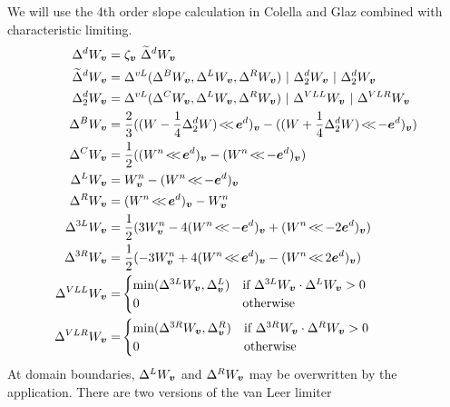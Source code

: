 We will use the 4th order slope calculation in Colella and Glaz
\cite{ColellaGlaz} combined with characteristic limiting.  
\begin{align*}
\Delta^d W_\vbold = & \; \zeta_\vbold ~ \widetilde{\Delta}^d W_\vbold \\
\widetilde{\Delta}^d W_\vbold = & \; 
\Delta^{vL}( \Delta^B W_\vbold,\Delta^L W_\vbold,\Delta^R W_\vbold ) ~
| ~ \Delta^d_2 W_\vbold ~ | ~ \Delta^d_2 W_\vbold \\ 
\Delta^d_2 W_\vbold = & \;
\Delta^{vL}(\Delta^C W_\vbold, \Delta^L W_\vbold, \Delta^R
W_\vbold)~|~\Delta^{VLL} W_\vbold~|~\Delta^{VLR} W_\vbold \\ 
\Delta^B W_\vbold = & \; \frac{2}{3}(\ebshift{(W -
\frac{1}{4}\Delta^d_2 W)}{\ebold^d})_\vbold - 
(\ebshift{(W + \frac{1}{4}\Delta^d_2 W)}{-\ebold^d})_\vbold) \\
\Delta^C {W}_\vbold = & \; \half((\ebshift{W^n}{ \ebold^d})_\vbold -
                                 (\ebshift{W^n}{-\ebold^d})_\vbold) \\
\Delta^L {W}_\vbold = & \; W^n_\vbold -
(\ebshift{W^n}{-\ebold^d})_\vbold \\ 
\Delta^R {W}_\vbold = & \; (\ebshift{W^n}{\ebold^d})_\vbold - W^n_\vbold \\
\Delta^{3L} {W}_\vbold = & \; \frac{1}{2}(3 W^n_\vbold -
4 (\ebshift{W^n}{-\ebold^d})_\vbold + (\ebshift{W^n}{-2\ebold^d})_\vbold )\\ 
\Delta^{3R} {W}_\vbold = & \; \frac{1}{2}(-3 W^n_\vbold +
4 (\ebshift{W^n}{\ebold^d})_\vbold -
                                 (\ebshift{W^n}{2\ebold^d})_\vbold)  \\
\Delta^{VLL} W_\vbold =&
  \begin{cases}
  \text{min}(\Delta^{3L} W_\vbold,  \Delta^L_{\vbold}) &
    \text{if $\Delta^{3L} W_\vbold \cdot \Delta^L W_{\vbold} > 0$}
  \\
  0 &
    \text{otherwise} \\
  \end{cases}  \\
\Delta^{VLR} W_\vbold =&
  \begin{cases}
  \text{min}(\Delta^{3R} W_\vbold,  \Delta^R_{\vbold}) &
    \text{if $\Delta^{3R} W_\vbold \cdot \Delta^R W_{\vbold} > 0$}
  \\
  0 &
    \text{otherwise}
  \end{cases} 
\end{align*}
At domain boundaries, $\Delta^L W_{\boldsymbol{v}}$ and $\Delta^R W_{\boldsymbol{v}}$ may
be overwritten by the application. There are two versions of the van Leer limiter 
